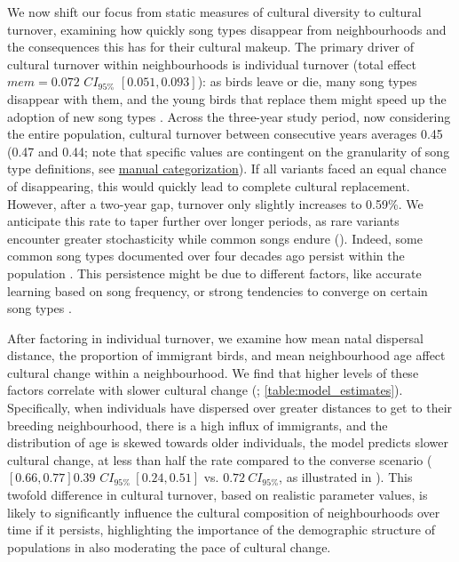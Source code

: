 We now shift our focus from static measures of cultural diversity to cultural turnover, examining how quickly song types disappear from neighbourhoods and the consequences this has for their cultural makeup. The primary driver of cultural turnover within neighbourhoods is individual turnover (total effect $mem = 0.072$ $CI_{95\%}$ $[0.051, 0.093]$): as birds leave or die, many song types disappear with them, and the young birds that replace them might speed up the adoption of new song types \autocite{dyble2024}. Across the three-year study period, now considering the entire population, cultural turnover between consecutive years averages 0.45 (0.47 and 0.44; note that specific values are contingent on the granularity of song type definitions, see \hyperref[sc:manual-categorization]{manual categorization}). If all variants faced an equal chance of disappearing, this would quickly lead to complete cultural replacement. However, after a two-year gap, turnover only slightly increases to 0.59\%. We anticipate this rate to taper further over longer periods, as rare variants encounter greater stochasticity while common songs endure (). Indeed, some common song types documented over four decades ago persist within the population \autocite{mcgregor1982b, keen2020}. This persistence might be due to different factors, like accurate learning based on song frequency, or strong tendencies to converge on certain song types \autocite{lachlan2018, tchernichovski2021, james2017, claidiere2007}.

After factoring in individual turnover, we examine how mean natal dispersal distance, the proportion of immigrant birds, and mean neighbourhood age affect cultural change within a neighbourhood. We find that higher levels of these factors correlate with slower cultural change  (; \autoref{table:model_estimates}). Specifically, when individuals have dispersed over greater distances to get to their breeding neighbourhood, there is a high influx of immigrants, and the distribution of age is skewed towards older individuals, the model predicts slower cultural change, at less than half the rate compared to the converse scenario ($[0.66, 0.77]$$0.39$ $CI_{95\%}~[0.24, 0.51]$ vs. $0.72~CI_{95\%}$, as illustrated in ). This twofold difference in cultural turnover, based on realistic parameter values, is likely to significantly influence the cultural composition of neighbourhoods over time if it persists, highlighting the importance of the demographic structure of populations in also moderating the pace of cultural change.

